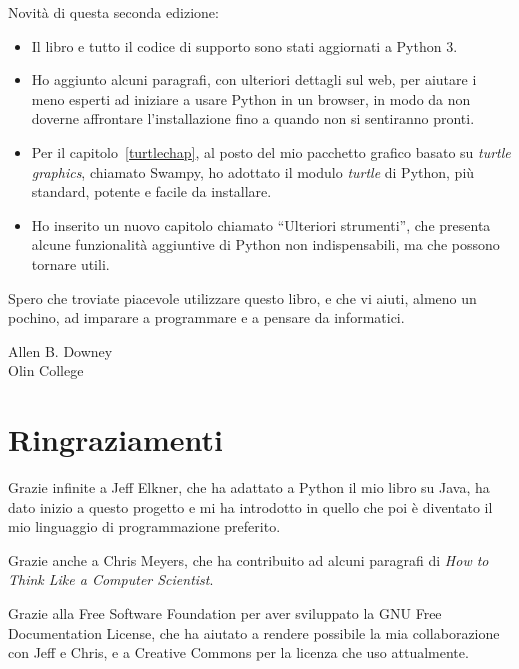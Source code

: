 \documentclass[10pt]{book}
\begin{document}
Novità di questa seconda edizione:

\begin{itemize}

\item Il libro e tutto il codice di supporto sono stati aggiornati a Python 3.

\item Ho aggiunto alcuni paragrafi, con ulteriori dettagli sul web, per aiutare i meno esperti ad iniziare a usare Python in un browser, in modo da non doverne affrontare l'installazione fino a quando non si sentiranno pronti.

\item Per il capitolo~\ref{turtlechap}, al posto del mio pacchetto grafico basato su {\em turtle graphics}, chiamato Swampy, ho adottato il modulo {\em turtle} di Python, più standard, potente e facile da installare.

\item Ho inserito un nuovo capitolo chiamato ``Ulteriori strumenti'', che presenta alcune funzionalità aggiuntive di Python non indispensabili, ma che possono tornare utili.

\end{itemize}

Spero che troviate piacevole utilizzare questo libro, e che vi aiuti, almeno un pochino, ad imparare a programmare e a pensare da informatici.


Allen B. Downey \\

Olin College\\


\section*{Ringraziamenti}

Grazie infinite a Jeff Elkner, che ha adattato a Python il mio libro su Java, ha dato inizio a questo progetto e mi ha introdotto in quello che poi è diventato il mio linguaggio di programmazione preferito. 

Grazie anche a Chris Meyers, che ha contribuito ad alcuni paragrafi di
{\em How to Think Like a Computer Scientist}.

Grazie alla Free Software Foundation per aver sviluppato la GNU Free Documentation License, che ha aiutato a rendere possibile la mia collaborazione con Jeff e Chris, e a Creative Commons per la licenza che uso attualmente.
\end{document}
